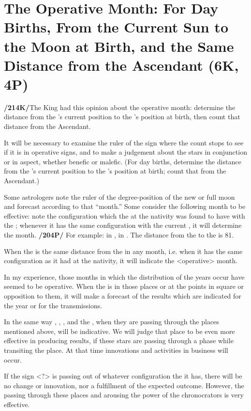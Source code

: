 \section{The Operative Month: For Day Births, From the Current Sun to the Moon at Birth, and the Same Distance from the Ascendant (6K, 4P)}

\textbf{/214K/}The King had this opinion about the operative month: determine the distance from the \Sun’s current position to the \Moon’s position at birth, then count that distance from the Ascendant. 

It will be necessary to examine the ruler of the sign where the count stops to see if it is in operative signs, and to make a judgement about the stars in conjunction or in aspect, whether benefic or malefic. (For day births, determine the distance from the \Moon’s current position to the \Sun’s position at birth; count that from the Ascendant.)

Some astrologers note the ruler of the degree-position of the new or full moon and forecast according to that “month.” Some consider the following month to be effective: note the configuration which the \Moon\xspace at the nativity was found to have with the \Sun; whenever it has the same configuration with the current \Sun,
it will determine the month. \textbf{/204P/} For example: \Sun\xspace in \Leo\xspace 5\deg, \Moon\xspace in \Libra\xspace 2\deg. The distance from
the \Sun\xspace to the \Moon\xspace is 81\deg. 

When the \Moon\xspace is the same distance from the \Sun\xspace in any month, i.e. when it has the same configuration as it had at the nativity, it will indicate the <operative> month.

In my experience, those months in which the distribution of the years occur have seemed to be operative. When the \Sun\xspace is in those places or at the points in square or opposition to them, it will make a
forecast of the results which are indicated for the year or for the transmissions. 

In the same way \Mars, \Venus, \Mercury, and the \Moon, when they are passing through the places mentioned above, will be indicative. We will judge that place to be even more effective in producing results, if these stars are passing through a phase while transiting the place. At that time innovations and activities in business will occur. 

If the sign <?> is passing out of whatever configuration the it has, there will be no change or innovation, nor a fulfillment of the expected outcome. However, the \Sun\xspace passing through these places and
arousing the power of the chronocrators is very effective.



\newpage